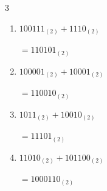 \begin{multicols}{3}
\begin{enumerate}
  \item $100111_{(2)} + 1110_{(2)}$

        $=110101_{(2)}$

  \item $100001_{(2)} + 10001_{(2)}$

        $=110010_{(2)}$

  \item $1011_{(2)} + 10010_{(2)}$

        $=11101_{(2)}$

  \item $11010_{(2)} + 101100_{(2)}$

        $=1000110_{(2)}$

\end{enumerate}
\end{multicols}

